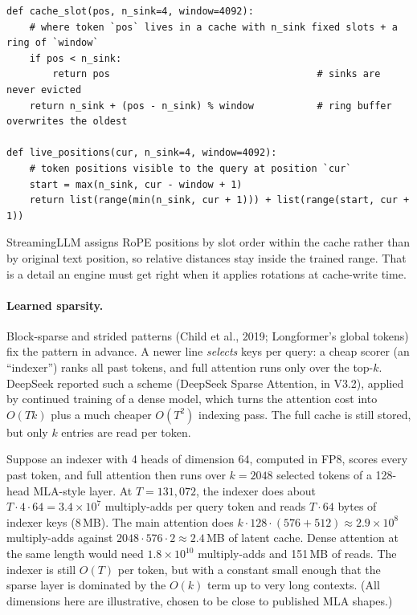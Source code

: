 \begin{lstlisting}[caption={Slot assignment for a sink-plus-window cache of fixed size $s+w$.},label={lst:attnalt:sink}]
def cache_slot(pos, n_sink=4, window=4092):
    # where token `pos` lives in a cache with n_sink fixed slots + a ring of `window`
    if pos < n_sink:
        return pos                                    # sinks are never evicted
    return n_sink + (pos - n_sink) % window           # ring buffer overwrites the oldest

def live_positions(cur, n_sink=4, window=4092):
    # token positions visible to the query at position `cur`
    start = max(n_sink, cur - window + 1)
    return list(range(min(n_sink, cur + 1))) + list(range(start, cur + 1))
\end{lstlisting}
StreamingLLM assigns RoPE positions by slot order within the cache rather than by original text position,
so relative distances stay inside the trained range. That is a detail an engine must get right when it
applies rotations at cache-write time.


\paragraph{Learned sparsity.} Block-sparse and strided patterns (Child et al., 2019; Longformer's global
tokens) fix the pattern in advance. A newer line \emph{selects} keys per query: a cheap scorer (an
``indexer'') ranks all past tokens, and full attention runs only over the top-$k$. DeepSeek reported such a
scheme (DeepSeek Sparse Attention, in V3.2), applied by continued training of a dense model, which turns the
attention cost into $O(Tk)$ plus a much cheaper $O(T^2)$ indexing pass. The full cache is still stored, but
only $k$ entries are read per token.
\begin{napkinmath}
Suppose an indexer with 4 heads of dimension 64, computed in FP8, scores every past token, and full attention
then runs over $k=2048$ selected tokens of a 128-head MLA-style layer. At $T=131{,}072$, the indexer does
about $T\cdot4\cdot64=3.4\times10^7$ multiply-adds per query token and reads $T\cdot64$ bytes of indexer keys
(8\,MB). The main attention does $k\cdot128\cdot(576+512)\approx2.9\times10^8$ multiply-adds against
$2048\cdot576\cdot2\approx2.4$\,MB of latent cache. Dense attention at the same length would need
$1.8\times10^{10}$ multiply-adds and 151\,MB of reads. The indexer is still $O(T)$ per token, but with a
constant small enough that the sparse layer is dominated by the $O(k)$ term up to very long contexts. (All
dimensions here are illustrative, chosen to be close to published MLA shapes.)
\end{napkinmath}


